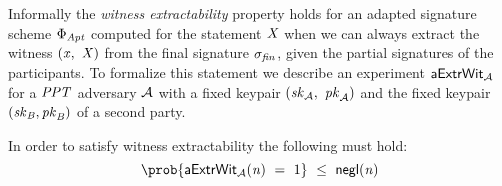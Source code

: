 \begin{definition}
    Informally the \textit{witness extractability} property holds for an adapted signature scheme $\Phi_{\mathit{Apt}}$ computed for the statement $\mathit{X}$ when we can always extract the witness
    $(\mathit{x} ,~ \mathit{X})$ from the final signature $\sigma_{\mathit{fin}}$, given the partial signatures of the participants.
    To formalize this statement we describe an experiment $\mathsf{aExtrWit_{\mathcal{A}}}$ for a $\mathit{PPT}$ adversary $\mathcal{A}$ with a fixed keypair $(\mathit{sk}_{\mathcal{A}} ,~ \mathit{pk}_{\mathcal{A}})$
    and the fixed keypair $(\mathit{sk}_{\mathit{B}}, \mathit{pk}_{\mathit{B}})$ of a second party.

    \begin{center}
        \fbox{
        \begin{varwidth}{\textwidth}
            \procedure[linenumbering]{$\procExpExt{\varN}$} {
            \varSet \opAssign \cnstEmptySet \\
            (\varMsg \opSeperate \varStatement) \opFunResult \cnstAdversary^{\procSignPtOracle{\cdot}}(\varPubKeyAdv) \\
            (\varSigPtAdv \opSeperate \varSigBob)\opFunResult \procSignPt{\varMsg}{\varSecKeyAdv}{\varSecKeyBob} \\
            \varSigAptAdv \opFunResult \cnstAdversary^{\procSignPtOracle{\cdot}}(\varPubKeyAdv \opSeperate \varSigPtAdv) \\
            \varSigFin \opFunResult \procFinSig{\varSigPtAdv}{\varSigBob} \\
            \funStar{\varWit} \opFunResult \procExtWit{\varSigFin}{\varSigBob}{\varSigAptAdv} \\
            \pcreturn (\varMsg \opNotIn \varSet \opAnd (\varStatement \opSeperate \funStar{\varWit}) \opNotIn \cnstRelation \opAnd \procVerf{\varMsg}{\varSigFin}{\varPubKeyAdv \opAddPoint \varPubKeyBob})
            }\\

            \procedure[linenumbering]{$\procSignPtOracle{\varMsg}$} {
            \varSet \opAssign \varSet \opUnion \varMsg \\
            \varSigPt \opFunResult \procSignPtSingle{\varMsg}{\varSecKey} \\
            \pcreturn \varSigPt
            }
        \end{varwidth}
        }
    \end{center}
    In order to satisfy witness extractability the following must hold:
    \[ \prob{\procExpExt{\varN} \opEq 1} \opSmEq \funNegl{\varN} \]
\end{definition}

